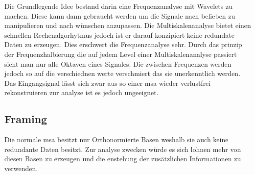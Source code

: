 
Die Grundlegende Idee bestand darin eine Frequenzanalyse mit Wavelets zu machen. Diese kann dann gebraucht werden um die Signale nach belieben zu manipulieren und nach wünschen anzupassen. Die Multiskalenanalyse bietet einen schnellen Rechenalgorhytmus jedoch ist er darauf konzipiert keine redundate Daten zu erzeugen. Dies erschwert die Frequenzanalyse sehr. Durch das prinzip der Frequenzhalbierung die auf jedem Level einer Multiskalenanalyse passiert sieht man nur alle Oktaven eines Signales. Die zwischen Frequenzen werden jedoch so auf die verschiednen werte verschmiert das sie unerkenntlich werden. Das Eingangsignal lässt sich zwar aus so einer msa wieder verlustfrei rekonstruieren zur analyse ist es jedoch ungeeignet.


\subsection{Framing}
Die normale msa besitzt nur Orthonormierte Basen weshalb sie auch keine redundante Daten besitzt. Zur analyse zwecken würde es sich lohnen mehr von diesen Basen zu erzeugen und die enstehung der zusätzlichen Informationen zu verwenden. 


